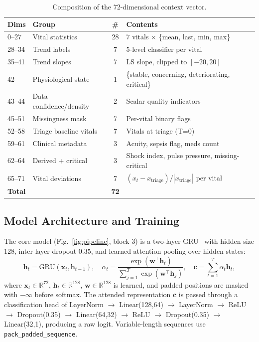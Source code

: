 \documentclass[runningheads]{llncs}
\begin{document}
\begin{table}[t]
\caption{Composition of the 72-dimensional context vector.}
\label{tab:ctx}
\centering\small
\begin{tabular}{llcl}
\toprule
\textbf{Dims} & \textbf{Group} & \textbf{\#} & \textbf{Contents} \\
\midrule
0--27  & Vital statistics        & 28 & 7 vitals $\times$ \{mean, last, min, max\} \\
28--34 & Trend labels            &  7 & 5-level classifier per vital \\
35--41 & Trend slopes            &  7 & LS slope, clipped to $[-20, 20]$ \\
42     & Physiological state     &  1 & \{stable, concerning, deteriorating, critical\} \\
43--44 & Data confidence/density &  2 & Scalar quality indicators \\
45--51 & Missingness mask        &  7 & Per-vital binary flags \\
52--58 & Triage baseline vitals  &  7 & Vitals at triage (T=0) \\
59--61 & Clinical metadata       &  3 & Acuity, sepsis flag, meds count \\
62--64 & Derived + critical      &  3 & Shock index, pulse pressure, missing-critical \\
65--71 & Vital deviations        &  7 & $(x_t - x_\text{triage})/|x_\text{triage}|$ per vital \\
\midrule
\multicolumn{2}{l}{\textbf{Total}} & \textbf{72} & \\
\bottomrule
\end{tabular}
\end{table}

\subsection{Model Architecture and Training}
The core model (Fig.~\ref{fig:pipeline}, block 3) is a two-layer GRU~\cite{Cho2014} with hidden size 128, inter-layer dropout $0.35$, and learned attention pooling over hidden states:
\begin{equation}
\mathbf{h}_t = \mathrm{GRU}(\mathbf{x}_t, \mathbf{h}_{t-1}), \quad
\alpha_t = \frac{\exp(\mathbf{w}^\top \mathbf{h}_t)}{\sum_{j=1}^{T}\exp(\mathbf{w}^\top \mathbf{h}_j)}, \quad
\mathbf{c} = \sum_{t=1}^{T} \alpha_t \mathbf{h}_t,
\end{equation}
where $\mathbf{x}_t \in \mathbb{R}^{72}$, $\mathbf{h}_t \in \mathbb{R}^{128}$, $\mathbf{w} \in \mathbb{R}^{128}$ is learned, and padded positions are masked with $-\infty$ before softmax. The attended representation $\mathbf{c}$ is passed through a classification head of LayerNorm $\to$ Linear(128,64) $\to$ LayerNorm $\to$ ReLU $\to$ Dropout(0.35) $\to$ Linear(64,32) $\to$ ReLU $\to$ Dropout(0.35) $\to$ Linear(32,1), producing a raw logit. Variable-length sequences use \texttt{pack\_padded\_sequence}.
\end{document}

